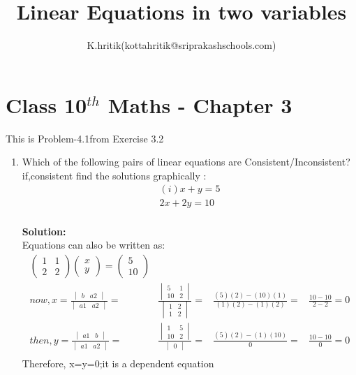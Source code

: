 \documentclass[12pt]{article}
\title{Linear Equations in two variables }
\author{K.hritik(kottahritik@sriprakashschools.com)}
\newcommand{\myvec}[1]{\ensuremath{\begin{pmatrix}#1\end{pmatrix}}}
\newcommand{\mydet}[1]{\ensuremath{\begin{vmatrix}#1\end{vmatrix}}}
\newcommand{\solution}{\noindent \textbf{Solution: }}
\begin{document}
\maketitle
\section*{Class 10$^{th}$ Maths - Chapter 3}
This is Problem-4.1from Exercise 3.2
\begin{enumerate}
\item Which of the following pairs of linear equations are Consistent/Inconsistent?if,consistent find the solutions graphically :\\
\begin{align}
    (i)x+y=5\\
         2x+2y=10 \\ 
\end{align}
      
\solution \\
            Equations  can also be written as:\\     
\begin{align}
\myvec{1&1\\2&2}\myvec{x\\y} = \myvec{5\\10}\\
now,x=\frac{\mydet{ b & a2}}{\mydet{ a1 & a2}} =&
\frac{\mydet{ 5 & 1 \\ 10 & 2}}{\mydet{1&2\\1&2}} =&
\frac{(5)(2)-(10)(1)}{(1)(2)-(1)(2)} =&
\frac{10-10}{2-2} = 0 \\
then,y=\frac{\mydet{a1&b}}{\mydet{a1&a2}} =&
\frac{\mydet{1&5\\10&2}}{\mydet{0}} =&
\frac{(5)(2)-(1)(10)}{0} =&
\frac{10-10}{0} = 0\\
\end{align}
Therefore, x=y=0;it is a dependent equation

	

\end{enumerate}
\end{document}

